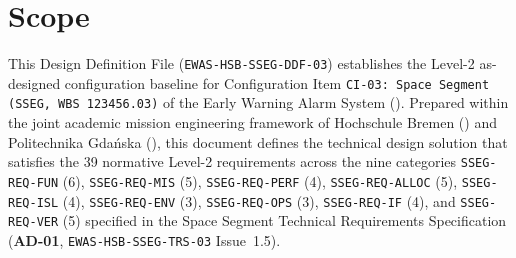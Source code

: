 \section{Scope}

This Design Definition File (\texttt{EWAS-HSB-SSEG-DDF-03}) establishes the Level-2 as-designed configuration baseline for Configuration Item \texttt{CI-03: Space Segment (SSEG, WBS 123456.03)} of the Early Warning Alarm System (). Prepared within the joint academic mission engineering framework of Hochschule Bremen () and Politechnika Gdańska (), this document defines the technical design solution that satisfies the 39 normative Level-2 requirements across the nine categories \texttt{SSEG-REQ-FUN} (6), \texttt{SSEG-REQ-MIS} (5), \texttt{SSEG-REQ-PERF} (4), \texttt{SSEG-REQ-ALLOC} (5), \texttt{SSEG-REQ-ISL} (4), \texttt{SSEG-REQ-ENV} (3), \texttt{SSEG-REQ-OPS} (3), \texttt{SSEG-REQ-IF} (4), and \texttt{SSEG-REQ-VER} (5) specified in the Space Segment Technical Requirements Specification (\textbf{AD-01}, \texttt{EWAS-HSB-SSEG-TRS-03} Issue~1.5).

